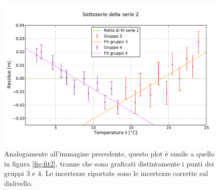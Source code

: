 \begin{figure}[p]
    \centering
    \includegraphics[width=130mm]{immagini/fit2r.pdf}
    \caption{Analogamente all'immagine precedente, questo plot è simile a quello in figura \ref{fig:fit2},
    tranne che sono graficati distintamente i punti dei gruppi 3 e 4. Le incertezze riportate sono le incertezze
    corrette sul dislivello.}
    \label{fig:fit2r}
\end{figure}
